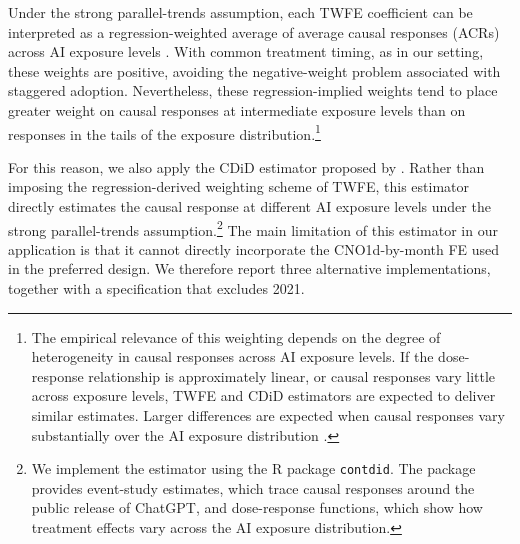 Under the strong parallel-trends assumption, each TWFE coefficient can be interpreted as a regression-weighted average of average causal responses (ACRs) across AI exposure levels \citep{callaway_goodmanbacon_santanna_2024}. With common treatment timing, as in our setting, these weights are positive, avoiding the negative-weight problem associated with staggered adoption. Nevertheless, these regression-implied weights tend to place greater weight on causal responses at intermediate exposure levels than on responses in the tails of the exposure distribution.\footnote{The empirical relevance of this weighting depends on the degree of heterogeneity in causal responses across AI exposure levels. If the dose-response relationship is approximately linear, or causal responses vary little across exposure levels, TWFE and CDiD estimators are expected to deliver similar estimates. Larger differences are expected when causal responses vary substantially over the AI exposure distribution \citep{callaway_goodmanbacon_santanna_2024}.}

For this reason, we also apply the CDiD estimator proposed by \citet{callaway_goodmanbacon_santanna_2024}. Rather than imposing the regression-derived weighting scheme of TWFE, this estimator directly estimates the causal response at different AI exposure levels under the strong parallel-trends assumption.\footnote{We implement the estimator using the R package \texttt{contdid}. The package provides event-study estimates, which trace causal responses around the public release of ChatGPT, and dose-response functions, which show how treatment effects vary across the AI exposure distribution.} The main limitation of this estimator in our application is that it cannot directly incorporate the CNO1d-by-month FE used in the preferred design. We therefore report three alternative implementations, together with a specification that excludes 2021.


